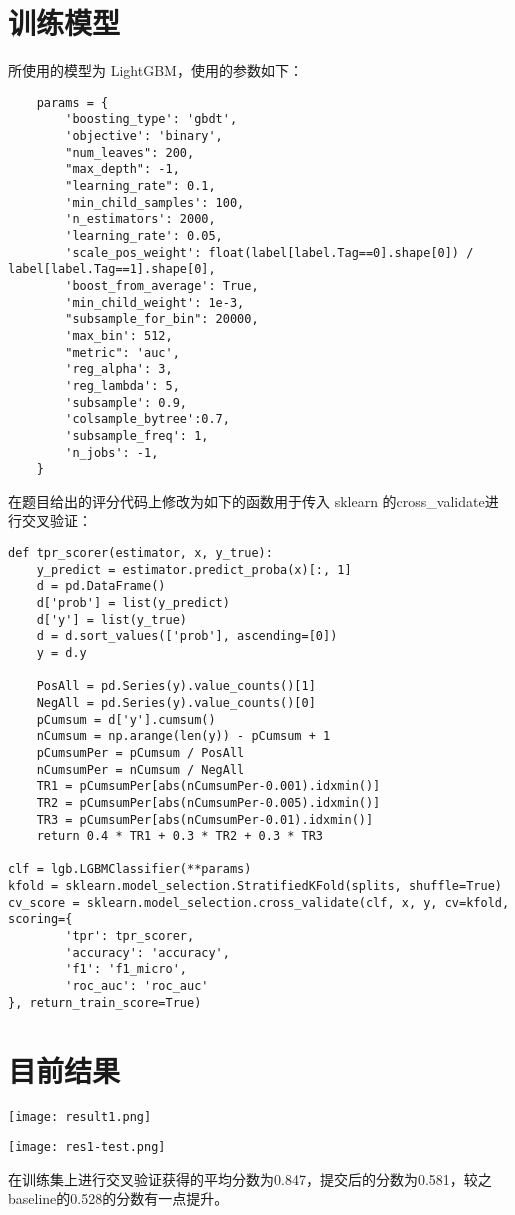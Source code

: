 \documentclass[12pt]{article}
\begin{document}
\section{训练模型}
\hspace{\parindent}所使用的模型为 LightGBM，使用的参数如下：

\begin{lstlisting}
    params = {
        'boosting_type': 'gbdt',
        'objective': 'binary',
        "num_leaves": 200,
        "max_depth": -1,
        "learning_rate": 0.1,
        'min_child_samples': 100,
        'n_estimators': 2000,
        'learning_rate': 0.05,
        'scale_pos_weight': float(label[label.Tag==0].shape[0]) / label[label.Tag==1].shape[0],
        'boost_from_average': True,
        'min_child_weight': 1e-3,
        "subsample_for_bin": 20000,
        'max_bin': 512,
        "metric": 'auc',
        'reg_alpha': 3,
        'reg_lambda': 5,
        'subsample': 0.9,
        'colsample_bytree':0.7, 
        'subsample_freq': 1,
        'n_jobs': -1,
    }
\end{lstlisting}

在题目给出的评分代码上修改为如下的函数用于传入 sklearn 的cross\_validate进行交叉验证：
\begin{lstlisting}
def tpr_scorer(estimator, x, y_true):
    y_predict = estimator.predict_proba(x)[:, 1]
    d = pd.DataFrame()
    d['prob'] = list(y_predict)
    d['y'] = list(y_true)
    d = d.sort_values(['prob'], ascending=[0])
    y = d.y
    
    PosAll = pd.Series(y).value_counts()[1]
    NegAll = pd.Series(y).value_counts()[0]
    pCumsum = d['y'].cumsum()
    nCumsum = np.arange(len(y)) - pCumsum + 1
    pCumsumPer = pCumsum / PosAll
    nCumsumPer = nCumsum / NegAll
    TR1 = pCumsumPer[abs(nCumsumPer-0.001).idxmin()]
    TR2 = pCumsumPer[abs(nCumsumPer-0.005).idxmin()]
    TR3 = pCumsumPer[abs(nCumsumPer-0.01).idxmin()]
    return 0.4 * TR1 + 0.3 * TR2 + 0.3 * TR3

clf = lgb.LGBMClassifier(**params)
kfold = sklearn.model_selection.StratifiedKFold(splits, shuffle=True)
cv_score = sklearn.model_selection.cross_validate(clf, x, y, cv=kfold, scoring={
        'tpr': tpr_scorer,
        'accuracy': 'accuracy',
        'f1': 'f1_micro',
        'roc_auc': 'roc_auc'
}, return_train_score=True)
\end{lstlisting}


\section{目前结果}
\begin{center}
    \texttt{[image: result1.png]}
\end{center}
\begin{center}
    \texttt{[image: res1-test.png]}
\end{center}
在训练集上进行交叉验证获得的平均分数为0.847，提交后的分数为0.581，较之 baseline的0.528的分数有一点提升。
\end{document}

